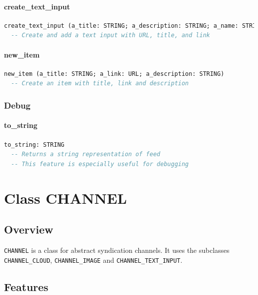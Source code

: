 \subsubsection{create\_text\_input}

\begin{lstlisting}[language=Eiffel]
create_text_input (a_title: STRING; a_description: STRING; a_name: STRING; a_link: URL)
  -- Create and add a text input with URL, title, and link
\end{lstlisting}

\subsubsection{new\_item}

\begin{lstlisting}[language=Eiffel]
new_item (a_title: STRING; a_link: URL; a_description: STRING)
  -- Create an item with title, link and description
\end{lstlisting}

\subsection{Debug}
\label{sec:feed-debug}

\subsubsection{to\_string}

\begin{lstlisting}[language=Eiffel]
to_string: STRING
  -- Returns a string representation of feed
  -- This feature is especially useful for debugging
\end{lstlisting}


\chapter{Class CHANNEL}
\label{sec:feed-channel}


\section{Overview}
\label{sec:feed-channel-overview}

\texttt{CHANNEL} is a class for abstract syndication channels. It uses
the subclasses \texttt{CHANNEL\_CLOUD}, \texttt{CHANNEL\_IMAGE} and
\texttt{CHANNEL\_TEXT\_INPUT}.


\section{Features}
\label{sec:feed-channel-features}

